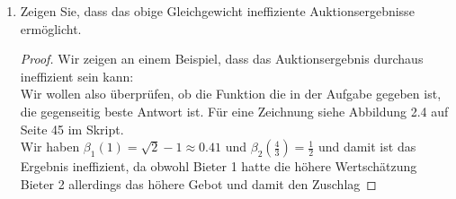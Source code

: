 \documentclass[12pt]{extreport} %
\theoremstyle{named}
\theoremstyle{itshape}
\theoremstyle{normal}
\begin{document}
\begin{enumerate}
\begin{proof}
		  	\textbf{Bieter 1}:
		\end{proof}
	\item Zeigen Sie, dass das obige Gleichgewicht ineffiziente Auktionsergebnisse ermöglicht.
		\begin{proof}
			Wir zeigen an einem Beispiel, dass das Auktionsergebnis durchaus ineffizient sein kann: \\
			
			Wir wollen also überprüfen, ob die Funktion die in der Aufgabe gegeben ist, die gegenseitig beste Antwort ist. Für eine Zeichnung siehe Abbildung 2.4 auf Seite 45 im Skript. \\

			  Wir haben $\beta_{1}(1) = \sqrt{2} - 1 \approx 0.41$ und $\beta_{2}(\frac{4}{3}) = \frac{1}{2}$ und damit ist das Ergebnis ineffizient, da obwohl Bieter 1 hatte die höhere Wertschätzung Bieter 2 allerdings das höhere Gebot und damit den Zuschlag
		\end{proof}
\end{enumerate}
\end{document}
